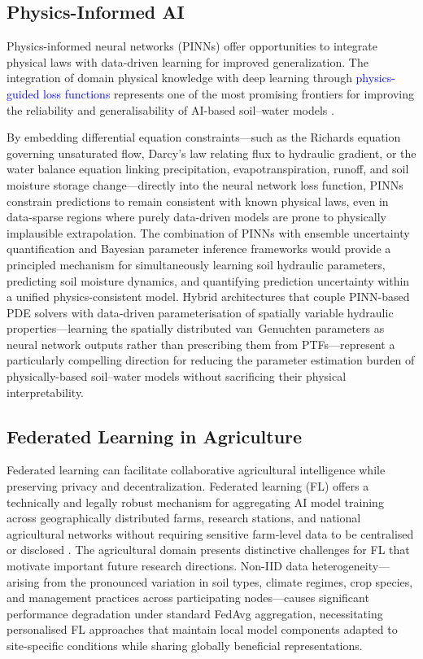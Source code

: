 \documentclass[land,article,submit,pdftex,moreauthors]{Definitions/mdpi}
\numberwithin{equation}{section}
\begin{document}
\subsection{Physics-Informed AI}

Physics-informed neural networks (PINNs) offer opportunities to integrate physical laws with data-driven learning for improved generalization. The integration of domain physical knowledge with deep learning through \textcolor{blue}{physics-guided loss functions} represents one of the most promising frontiers for improving the reliability and generalisability of AI-based soil--water models \citep{karniadakis2021physics}. 

By embedding differential equation constraints---such as the Richards equation governing unsaturated flow, Darcy's law relating flux to hydraulic gradient, or the water balance equation linking precipitation, evapotranspiration, runoff, and soil moisture storage change---directly into the neural network loss function, PINNs constrain predictions to remain consistent with known physical laws, even in data-sparse regions where purely data-driven models are prone to physically implausible extrapolation.  The combination of PINNs with ensemble uncertainty quantification and Bayesian parameter inference frameworks would provide a principled mechanism for simultaneously learning soil hydraulic parameters, predicting soil moisture dynamics, and quantifying prediction uncertainty within a unified physics-consistent model. Hybrid architectures that couple PINN-based PDE solvers with data-driven parameterisation of spatially variable hydraulic properties---learning the spatially distributed van~Genuchten parameters as neural network outputs rather than prescribing them from PTFs---represent a particularly compelling direction for reducing the parameter estimation burden of physically-based soil--water models without sacrificing their physical interpretability.

\subsection{Federated Learning in Agriculture}

Federated learning can facilitate collaborative agricultural intelligence while preserving privacy and decentralization. Federated learning (FL) offers a technically and legally robust mechanism for 
aggregating AI model training across geographically distributed farms, research 
stations, and national agricultural networks without requiring sensitive farm-level 
data to be centralised or disclosed \citep{zalik2023federated}. The agricultural domain presents distinctive challenges for FL that motivate important future research directions. Non-IID data heterogeneity---arising from the pronounced variation in soil types, climate regimes, crop species, and management practices across participating nodes---causes significant performance degradation under standard FedAvg aggregation, necessitating personalised FL approaches that maintain local model components adapted to site-specific conditions while sharing globally beneficial representations. 
\end{document}
